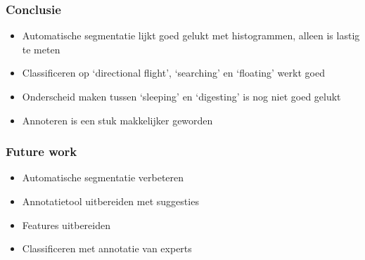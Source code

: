 \documentclass{beamer}
\newcommand{\slide}[2]
{
\begin{frame}
\frametitle{#1} 

#2

\end{frame}
}
\begin{document}
\slide{Conclusie}
{
\begin{itemize}
	\item Automatische segmentatie lijkt goed gelukt met histogrammen, alleen is lastig te meten
	\item Classificeren op `directional flight', `searching' en `floating' werkt goed
	\item Onderscheid maken tussen `sleeping' en `digesting' is nog niet goed gelukt
	\item Annoteren is een stuk makkelijker geworden
\end{itemize} 
}

\slide{Future work}
{
\begin{itemize}
	\item Automatische segmentatie verbeteren
	\item Annotatietool uitbereiden met suggesties
	\item Features uitbereiden
	\item Classificeren met annotatie van experts
\end{itemize} 
}
\end{document}
